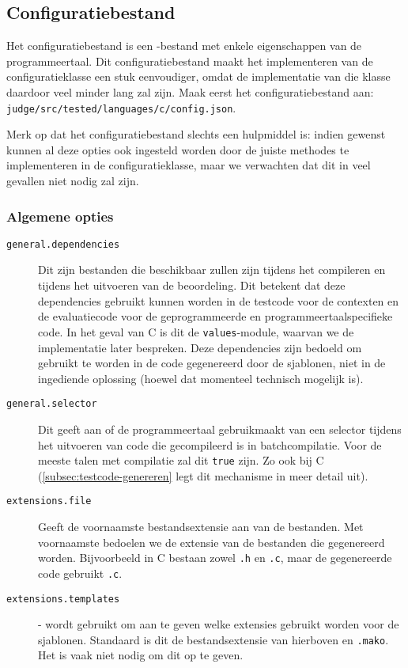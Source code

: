 \inputminted{text}{code/dirs-c-code-location.txt}

\subsection{Configuratiebestand}\label{subsec:configuratiebestand}

Het configuratiebestand is een -bestand met enkele eigenschappen van de programmeertaal.
Dit configuratiebestand maakt het implementeren van de configuratieklasse een stuk eenvoudiger, omdat de implementatie van die klasse daardoor veel minder lang zal zijn.
Maak eerst het configuratiebestand aan: \texttt{judge/src/tested/languages/c/config.json}.

Merk op dat het configuratiebestand slechts een hulpmiddel is: indien gewenst kunnen al deze opties ook ingesteld worden door de juiste methodes te implementeren in de configuratieklasse, maar we verwachten dat dit in veel gevallen niet nodig zal zijn.

\subsubsection{Algemene opties}

\begin{description}
    \item[\texttt{general.dependencies}] Dit zijn bestanden die beschikbaar zullen zijn tijdens het compileren en tijdens het uitvoeren van de beoordeling.
    Dit betekent dat deze dependencies gebruikt kunnen worden in de testcode voor de contexten en de evaluatiecode voor de geprogrammeerde en programmeertaalspecifieke code.
    In het geval van C is dit de \texttt{values}-module, waarvan we de implementatie later bespreken.
    Deze dependencies zijn bedoeld om gebruikt te worden in de code gegenereerd door de sjablonen, niet in de ingediende oplossing (hoewel dat momenteel technisch mogelijk is).
    \item[\texttt{general.selector}] Dit geeft aan of de programmeertaal gebruikmaakt van een selector tijdens het uitvoeren van code die gecompileerd is in batchcompilatie.
    Voor de meeste talen met compilatie zal dit \texttt{true} zijn.
    Zo ook bij C (\cref{subsec:testcode-genereren} legt dit mechanisme in meer detail uit).
    \item[\texttt{extensions.file}] Geeft de voornaamste bestandsextensie aan van de bestanden.
    Met voornaamste bedoelen we de extensie van de bestanden die gegenereerd worden.
    Bijvoorbeeld in C bestaan zowel \texttt{.h} en \texttt{.c}, maar de gegenereerde code gebruikt \texttt{.c}.
    \item[\texttt{extensions.templates}] - wordt gebruikt om aan te geven welke extensies gebruikt worden voor de sjablonen.
    Standaard is dit de bestandsextensie van hierboven en \texttt{.mako}.
    Het is vaak niet nodig om dit op te geven.
\end{description}


